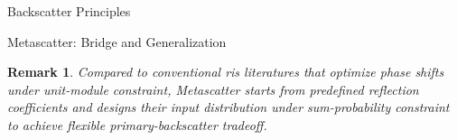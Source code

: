 \documentclass[journal]{IEEEtran}
\newtheorem{remark}{Remark}
\begin{document}
\begin{section}{Backscatter Principles}
\begin{subsection}{Metascatter: Bridge and Generalization}
		\begin{remark}
			Compared to conventional \gls{ris} literatures that optimize phase shifts under unit-module constraint, Metascatter starts from predefined reflection coefficients and designs their input distribution under sum-probability constraint to achieve flexible primary-backscatter tradeoff.
		\end{remark}
	\end{subsection}
\end{section}
\end{document}
